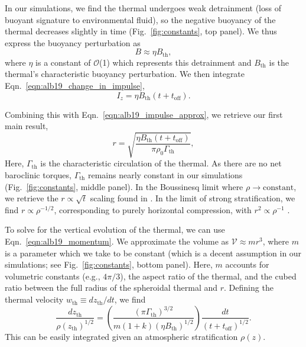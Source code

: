 In our simulations, we find the thermal undergoes weak detrainment (loss of buoyant signature to environmental fluid), so the negative buoyancy of the thermal decreases slightly in time (Fig.~\ref{fig:constants}, top panel).
We thus express the buoyancy perturbation as 
\begin{equation}
B \approx \eta B_{\text{th}},
\end{equation}
where $\eta$ is a constant of $\mathcal{O}$(1) which represents this detrainment and $B_{\text{th}}$ is the thermal's characteristic buoyancy perturbation. 
We then integrate Eqn.~\ref{eqn:alb19_change_in_impulse},
\begin{equation*}
I_z = \eta B_{\text{th}} (t + t_{\text{off}}).
\end{equation*}

Combining this with Eqn.~\ref{eqn:alb19_impulse_approx}, we retrieve our first main result,
\begin{equation}
r = \sqrt{\frac{\eta B_{\text{th}} (t + t_{\text{off}})}{\pi\rho_0\Gamma_{\text{th}}}},
\label{eqn:alb19_r_theory}
\end{equation}
Here, $\Gamma_{\text{th}}$ is the characteristic circulation of the thermal. As there are no net baroclinic torques, $\Gamma_{\text{th}}$ remains nearly constant in our simulations (Fig.~\ref{fig:constants}, middle panel).
In the Boussinesq limit where $\rho \rightarrow \text{constant}$, we retrieve the $r \propto \sqrt{t}$ scaling found in \LJ.
In the limit of strong stratification, we find $r \propto \rho^{-1/2}$, corresponding to purely horizontal compression, with $r^2 \propto \rho^{-1}$ \cite{brandenburg2016}.

To solve for the vertical evolution of the thermal, we can use Eqn.~\ref{eqn:alb19_momentum}.
We approximate the volume as $\mathcal{V} \approx m r^3$, where $m$ is a parameter which we take to be constant (which is a decent assumption in our simulations; see Fig.~\ref{fig:constants}, bottom panel).
Here, $m$ accounts for volumetric constants (e.g., $4\pi/3$), the aspect ratio of the thermal, and the cubed ratio between the full radius of the spheroidal thermal and $r$.
Defining the thermal velocity $w_{\text{th}} \equiv dz_{\text{th}}/dt$, we find
\begin{equation}
\frac{dz_{\text{th}}}{\rho(z_{\text{th}})^{1/2}} =
\left(\frac{(\pi\Gamma_{\text{th}})^{3/2}}{m(1 + k)(\eta B_{\text{th}})^{1/2}}\right)\frac{dt}{(t + t_{\text{off}})^{1/2}}.
\label{eqn:alb19_dz_theory}
\end{equation}
This can be easily integrated given an atmospheric stratification $\rho(z)$.

